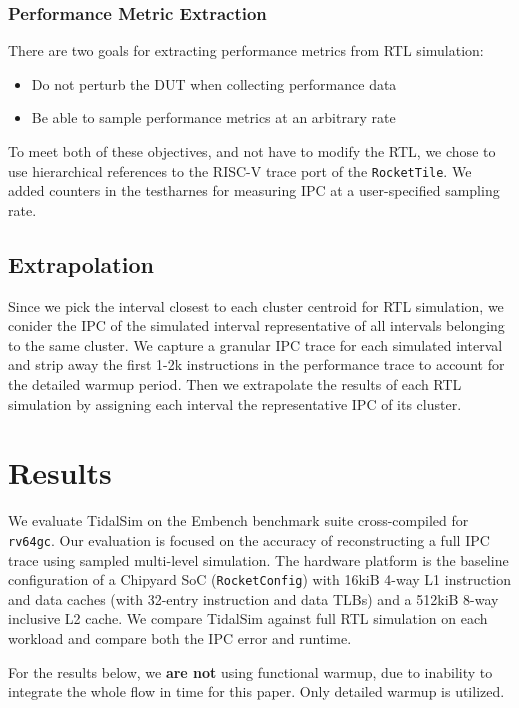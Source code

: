 \documentclass[sigplan,nonacm,10pt]{acmart}
\begin{document}
\subsubsection{Performance Metric Extraction}

There are two goals for extracting performance metrics from RTL simulation:
\begin{itemize}
  \item Do not perturb the DUT when collecting performance data
  \item Be able to sample performance metrics at an arbitrary rate
\end{itemize}

To meet both of these objectives, and not have to modify the RTL, we chose to use hierarchical references to the RISC-V trace port of the \texttt{RocketTile}.
We added counters in the testharnes for measuring IPC at a user-specified sampling rate.

\subsection{Extrapolation}

Since we pick the interval closest to each cluster centroid for RTL simulation, we conider the IPC of the simulated interval representative of all intervals belonging to the same cluster.
We capture a granular IPC trace for each simulated interval and strip away the first 1-2k instructions in the performance trace to account for the detailed warmup period.
Then we extrapolate the results of each RTL simulation by assigning each interval the representative IPC of its cluster.

\section{Results}

We evaluate TidalSim on the Embench benchmark suite\cite{embench} cross-compiled for \texttt{rv64gc}.
Our evaluation is focused on the accuracy of reconstructing a full IPC trace using sampled multi-level simulation.
The hardware platform is the baseline configuration of a Chipyard SoC (\texttt{RocketConfig}) with 16kiB 4-way L1 instruction and data caches (with 32-entry instruction and data TLBs) and a 512kiB 8-way inclusive L2 cache.
We compare TidalSim against full RTL simulation on each workload and compare both the IPC error and runtime.

For the results below, we \textbf{are not} using functional warmup, due to inability to integrate the whole flow in time for this paper.
Only detailed warmup is utilized.
\end{document}
